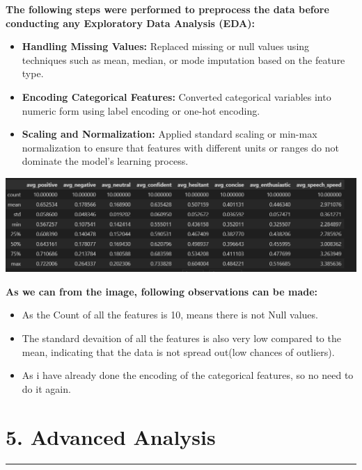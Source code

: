 \documentclass{article}
\begin{document}
\begin{tcolorbox}[colback=teal!5!white,colframe=teal!75!black,title= Steps for Data preprocessing]
\textbf{The following steps were performed to preprocess the data before conducting any Exploratory Data Analysis (EDA):}

\begin{itemize}
    \item \textbf{Handling Missing Values:} Replaced missing or null values using techniques such as mean, median, or mode imputation based on the feature type.
    \item \textbf{Encoding Categorical Features:} Converted categorical variables into numeric form using label encoding or one-hot encoding.
    \item \textbf{Scaling and Normalization:} Applied standard scaling or min-max normalization to ensure that features with different units or ranges do not dominate the model's learning process.
\end{itemize}
\begin{center}
    \includegraphics[width=1\columnwidth]{images_prompts/basic-stats.png}
\end{center}

\textbf{As we can from the image, following observations can be made:}
\begin{itemize}
    \item As the Count of all the features is 10, means there is not Null values.
    \item The standard devaition of all the features is also very low compared to the mean, indicating that the data is not spread out(low chances of outliers).
    \item As i have already done the encoding of the categorical features, so no need to do it again.
\end{itemize}

\end{tcolorbox}


\section{5. Advanced Analysis}
  \begin{center}
        \color{red}\rule{1\linewidth}{1mm}
    \end{center}
    
\end{document}

